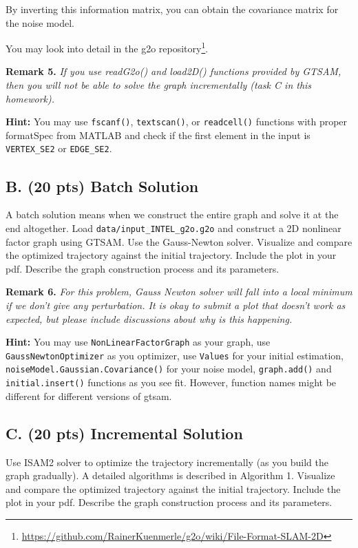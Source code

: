 \documentclass{article}
\begin{document}
By inverting this information matrix, you can obtain the covariance matrix for the noise model.

You may look into detail in the g2o repository\footnote{\url{https://github.com/RainerKuenmerle/g2o/wiki/File-Format-SLAM-2D}}.

\textbf{Remark 5.} \textit{If you use readG2o() and load2D() functions provided by GTSAM, then you will not be able to solve the graph incrementally (task C in this homework).}

\textbf{Hint:} You may use \texttt{fscanf()}, \texttt{textscan()}, or \texttt{readcell()} functions with proper formatSpec from MATLAB and check if the first element in the input is \texttt{VERTEX\_SE2} or \texttt{EDGE\_SE2}.

\subsection{B. (20 pts) Batch Solution}
A batch solution means when we construct the entire graph and solve it at the end altogether. Load \texttt{data/input\_INTEL\_g2o.g2o} and construct a 2D nonlinear factor graph using GTSAM. Use the Gauss-Newton solver. Visualize and compare the optimized trajectory against the initial trajectory. Include the plot in your pdf. Describe the graph construction process and its parameters.

\textbf{Remark 6.} \textit{For this problem, Gauss Newton solver will fall into a local minimum if we don't give any perturbation. It is okay to submit a plot that doesn't work as expected, but please include discussions about why is this happening.}

\textbf{Hint:} You may use \texttt{NonLinearFactorGraph} as your graph, use \texttt{GaussNewtonOptimizer} as you optimizer, use \texttt{Values} for your initial estimation, \texttt{noiseModel.Gaussian.Covariance()} for your noise model, \texttt{graph.add()} and \texttt{initial.insert()} functions as you see fit. However, function names might be different for different versions of gtsam.

\subsection{C. (20 pts) Incremental Solution}
Use ISAM2 solver to optimize the trajectory incrementally (as you build the graph gradually). A detailed algorithms is described in Algorithm 1. Visualize and compare the optimized trajectory against the initial trajectory. Include the plot in your pdf. Describe the graph construction process and its parameters.
\end{document}
